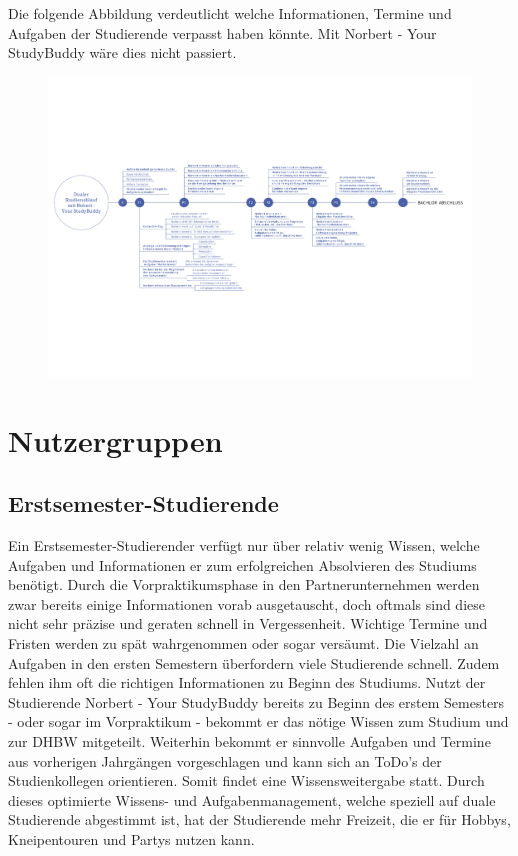Die folgende Abbildung verdeutlicht welche Informationen, Termine und Aufgaben der Studierende verpasst haben könnte. Mit Norbert - Your StudyBuddy wäre dies nicht passiert.

\newpage
\begin{landscape}
\vspace*{35mm}
	\begin{figure}[H]
	\centering
	\includegraphics[scale=0.75]{images/timeline.pdf}
	\end{figure}

\end{landscape}
\newpage

\section{Nutzergruppen}

\subsection{Erstsemester-Studierende}
Ein Erstsemester-Studierender verfügt nur über relativ wenig Wissen, welche Aufgaben und Informationen er zum erfolgreichen Absolvieren des Studiums benötigt. Durch die Vorpraktikumsphase in den Partnerunternehmen werden zwar bereits einige Informationen vorab ausgetauscht, doch oftmals sind diese nicht sehr präzise und geraten schnell in Vergessenheit. Wichtige Termine und Fristen werden zu spät wahrgenommen oder sogar versäumt. Die Vielzahl an Aufgaben in den ersten Semestern überfordern viele Studierende schnell. Zudem fehlen ihm oft die richtigen Informationen zu Beginn des Studiums. Nutzt der Studierende Norbert - Your StudyBuddy bereits zu Beginn des erstem Semesters - oder sogar im Vorpraktikum - bekommt er  das nötige Wissen zum Studium und zur DHBW mitgeteilt. Weiterhin bekommt er sinnvolle Aufgaben und Termine aus vorherigen Jahrgängen vorgeschlagen und kann sich an ToDo's der Studienkollegen orientieren. Somit findet eine Wissensweitergabe statt. Durch dieses optimierte Wissens- und Aufgabenmanagement, welche speziell auf duale Studierende abgestimmt ist, hat der Studierende mehr Freizeit, die er für Hobbys, Kneipentouren und Partys nutzen kann.


